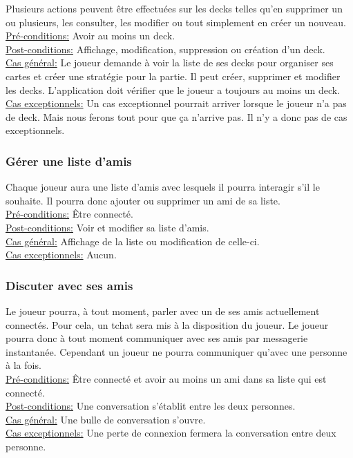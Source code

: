 \documentclass[11pt,a4paper]{article}
\begin{document}
Plusieurs actions peuvent être effectuées sur les decks telles
qu'en supprimer un ou plusieurs, les consulter, les modifier ou tout
simplement en créer un nouveau.\\
\underline{Pré-conditions:} 
 Avoir au moins un deck.\\
\underline{Post-conditions:} 
 Affichage, modification, suppression ou création d'un deck.\\
\underline{Cas général:} 
 Le joueur demande à voir la liste de ses decks pour organiser ses cartes et créer une stratégie pour la partie.  Il peut créer, supprimer et modifier les decks.  L'application doit vérifier que le joueur a toujours au moins un deck.\\
\underline{Cas exceptionnels:} 
 Un cas exceptionnel pourrait arriver lorsque le joueur n'a pas de deck.  Mais nous ferons tout pour que ça n'arrive pas.  Il n'y a donc pas de cas exceptionnels.\\

\subsubsection*{Gérer une liste d'amis}

Chaque joueur aura une liste d'amis avec lesquels il pourra
interagir s'il le souhaite. Il pourra donc ajouter ou supprimer un ami de sa liste.\\
\underline{Pré-conditions:} 
 Être connecté.\\
\underline{Post-conditions:} 
 Voir et modifier sa liste d'amis.\\
\underline{Cas général:} 
 Affichage de la liste ou modification de celle-ci.\\
\underline{Cas exceptionnels:} 
 Aucun.\\

\subsubsection*{Discuter avec ses amis}

Le joueur pourra, à tout moment, parler avec un de ses amis
actuellement connectés. Pour cela, un \gls{tchat} sera mis à la disposition
du joueur.  Le joueur pourra donc à tout moment communiquer avec ses amis par
messagerie instantanée. Cependant un joueur ne pourra communiquer qu'avec
une personne à la fois.\\
\underline{Pré-conditions:} 
 Être connecté et avoir au moins un ami dans sa liste qui est connecté.\\
\underline{Post-conditions:} 
 Une conversation s'établit entre les deux personnes.\\
\underline{Cas général:} 
 Une bulle de conversation s'ouvre.\\
\underline{Cas exceptionnels:} 
 Une perte de connexion fermera la conversation entre deux personne.\\
\end{document}
